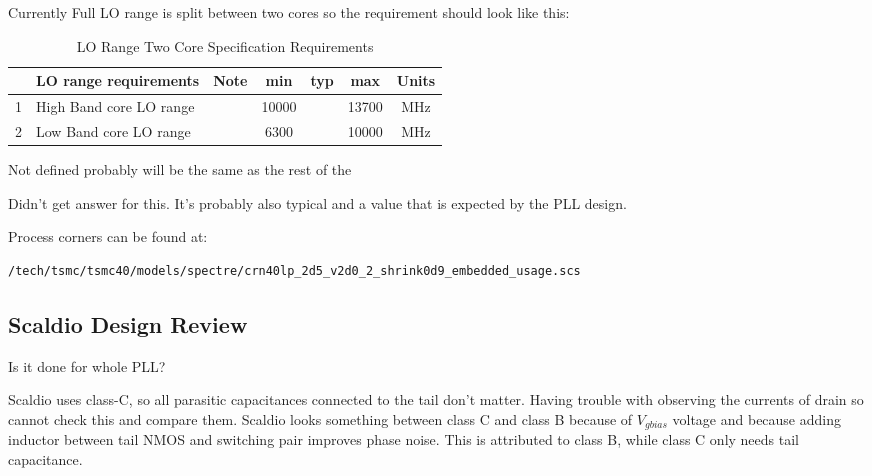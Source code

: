 \documentclass{article}
\begin{document}
Currently Full LO range is split between two cores so the requirement should look like this:

\begin{table}[ht]
	\centering
	\begin{tabular}{|c|l|c|c|c|c|c|}
		\hline
		& LO range requirements & Note & min & typ & max & Units \\
		\hline
		1 & High Band core LO range &  & 10000  &  & 13700 & MHz \\ 
		\hline
		2 & Low Band core LO range &  & 6300 &  & 10000 & MHz \\ 
		\hline
	\end{tabular}
	\caption{LO Range Two Core Specification Requirements} 
\end{table}

\begin{question}
	Not defined probably will be the same as the rest of the 
\end{question}


\begin{question}
	Didn't get answer for this. It's probably also typical and a value that is expected by the PLL design.
\end{question}


Process corners can be found at:

\begin{verbatim}
/tech/tsmc/tsmc40/models/spectre/crn40lp_2d5_v2d0_2_shrink0d9_embedded_usage.scs
\end{verbatim}

\subsection{Scaldio Design Review}

\begin{question}
Is it done for whole PLL?
\end{question}

\begin{question}
	Scaldio uses class-C, so all parasitic capacitances connected to the tail don't matter. Having trouble with observing the currents of drain so cannot check this and compare them. Scaldio looks something between class C and class B because of $V_{gbias}$ voltage and because adding inductor between tail NMOS and switching pair improves phase noise. This is attributed to class B, while class C only needs tail capacitance.
\end{question}
\end{document}

